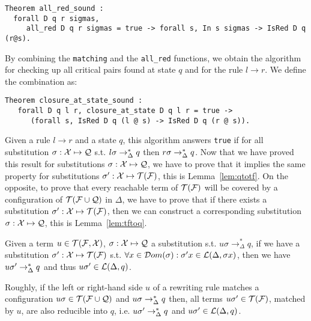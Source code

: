 \begin{lstlisting}
Theorem all_red_sound : 
  forall D q r sigmas, 
     all_red D q r sigmas = true -> forall s, In s sigmas -> IsRed D q (r@s).
\end{lstlisting}

By combining the \lstinline!matching! and the \lstinline!all_red! functions, 
we obtain the algorithm for checking up all critical pairs
found at state $q$ and for the rule $l \rightarrow r$. We define the combination
as:


\begin{lstlisting}
Theorem closure_at_state_sound : 
   forall D q l r, closure_at_state D q l r = true -> 
      (forall s, IsRed D q (l @ s) -> IsRed D q (r @ s)).
\end{lstlisting}

  Given a rule $l \rightarrow r$ and a state $q$, this algorithm answers
  \lstinline!true! if for all substitution $\sigma: {\cal X} \mapsto \mathcal{Q}$ s.t. $l
  \sigma \rightarrow^*_\Delta q$ then $r\sigma \rightarrow^*_{\Delta} q$. Now that we have
  proved this result for substitutions $\sigma:{\cal X} \mapsto \mathcal{Q}$, we have to prove
  that it implies the same property for substitutions $\sigma':{\cal X} \mapsto {\cal T(F)}$,
  this is Lemma~\ref{lem:qtotf}. On the opposite, to prove that every reachable
  term of ${\cal T(F)}$ will be covered by a configuration of ${\cal T(F \cup Q)}$ in $\Delta$, we
  have to prove that if there exists a substitution $\sigma': {\cal X} \mapsto {\cal T(F)}$,
  then we can construct a corresponding substitution $\sigma: {\cal X} \mapsto \mathcal{Q}$,
  this is Lemma~\ref{lem:tftoq}.
\begin{lemma}
\label{lem:qtotf}
Given a term $u \in \mathcal{T}(\mathcal{F}, {\cal X})$, $\sigma :{\cal X} \mapsto \mathcal{Q}$ a substitution
s.t. $u\sigma \rightarrow^*_\Delta q$, if we have a substitution $\sigma' :{\cal X}
\mapsto {\cal T(F)}$ s.t. $\forall x \in {\cal D}om(\sigma): \sigma' x \in {\cal L}(\Delta,
\sigma x)$, then we have $u\sigma' \rightarrow^*_{\Delta} q$ and thus $u\sigma' \in
{\cal L}(\Delta, q)$.
\end{lemma}

Roughly, if the left or right-hand side $u$ of a rewriting rule matches
a configuration $u\sigma \in {\cal T(F \cup Q)}$ and $u\sigma
\rightarrow^*_{\Delta} q$ then, all terms $u\sigma' \in {\cal T(F)}$, matched by $u$, 
are also reducible into $q$, i.e. $u\sigma' \rightarrow^*_{\Delta} q$ and $u\sigma' \in
{\cal L}(\Delta,q)$.

